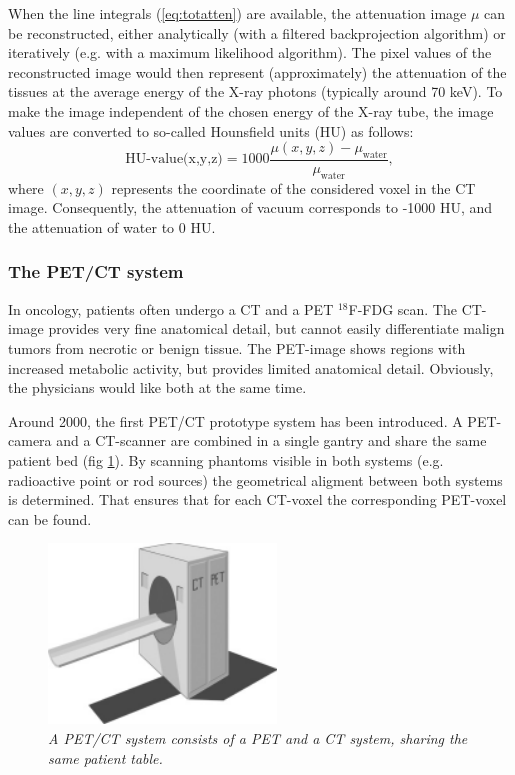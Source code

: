 \documentclass[11pt,oneside]{article}
\begin{document}
When the line integrals (\ref{eq:totatten}) are available, the
attenuation image $\mu$ can be reconstructed, either analytically
(with a filtered backprojection algorithm) or iteratively (e.g. with a
maximum likelihood algorithm). The pixel values of the reconstructed
image would then represent (approximately) the attenuation of the
tissues at the average energy of the X-ray photons (typically around
70 keV). To make the image independent of the chosen energy of the
X-ray tube, the image values are converted to so-called Hounsfield
units (HU) as follows:
\begin{equation}
  \mbox{HU-value(x,y,z)} 
    = 1000 \frac{\mu(x,y,z) - \mu_{\mbox{water}}}{\mu_{\mbox{water}}},
\end{equation}
where $(x,y,z)$ represents the coordinate of the considered voxel in
the CT image.  Consequently, the attenuation of vacuum corresponds to
-1000 HU, and the attenuation of water to 0 HU.

\subsubsection{The PET/CT system}
In oncology, patients often undergo a CT and a PET $^{18}$F-FDG scan. The
CT-image provides very fine anatomical detail, but cannot easily differentiate
malign tumors from necrotic or benign tissue. The PET-image shows regions with
increased metabolic activity, but provides limited anatomical detail.
Obviously, the physicians would like both at the same time.

Around 2000, the first PET/CT prototype system has been introduced. A
PET-camera and a CT-scanner are combined in a single gantry and share
the same patient bed (fig \ref{fig:petct}). By scanning phantoms
visible in both systems (e.g. radioactive point or rod sources) the
geometrical aligment between both systems is determined. That ensures
that for each CT-voxel the corresponding PET-voxel can be found.
%
\begin{figure}[tbp]
\centering
\includegraphics[width=0.54\textwidth]{figs/fig_petct.pdf}
\caption{\label{fig:petct} \emph{A PET/CT system consists of a PET and
 a CT system, sharing the same patient table.}}
\end{figure}
\end{document}
